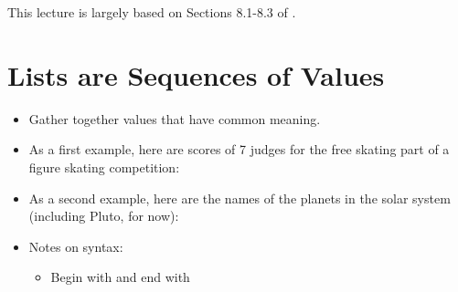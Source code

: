 \documentclass[letterpaper,10pt,english]{sphinxmanual}
\begin{document}
This lecture is largely based on Sections 8.1-8.3 of .


\section{Lists are Sequences of Values}
\label{\detokenize{lecture_notes/lec08_lists1:lists-are-sequences-of-values}}\begin{itemize}
\item {} 
Gather together values that have common meaning.

\item {} 
As a first example, here are scores of 7 judges for the free
skating part of a figure skating competition:

%
\begin{sphinxVerbatim}[commandchars=\\\{\}]
  \PYG{p}{[}        \PYG{p}{]}
\end{sphinxVerbatim}

\item {} 
As a second example, here are the names of the planets in the solar
system (including Pluto, for now):

%
\begin{sphinxVerbatim}[commandchars=\\\{\}]
  \PYG{p}{[}     
        \PYG{p}{]}
\end{sphinxVerbatim}

\item {} 
Notes on syntax:
\begin{itemize}
\item {} 
Begin with \sphinxcode{\sphinxupquote{{[}}} and end with \sphinxcode{\sphinxupquote{{]}}}


\end{itemize}
\end{itemize}
\end{document}

